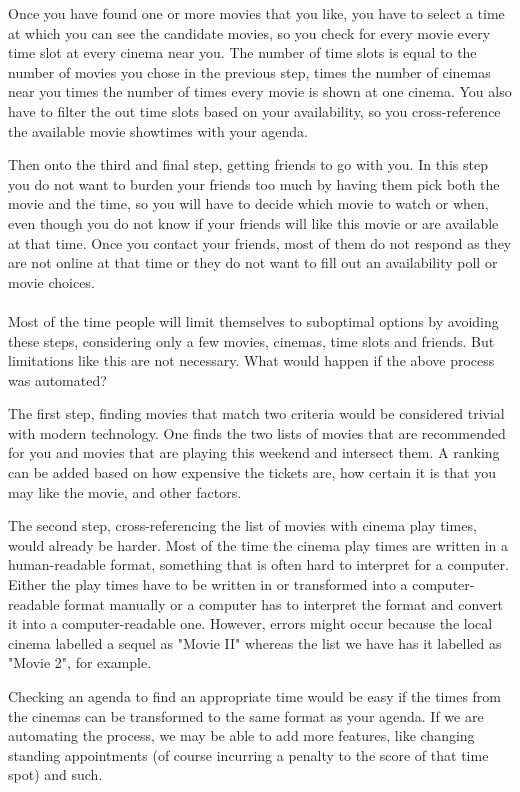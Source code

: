 \documentclass{article}
\begin{document}
 Once you have found one or more movies that you like, you have to select a time at which you can see the candidate movies, so you check for every movie every time slot at every cinema near you. The number of time slots is equal to the number of movies you chose in the previous step, times the number of cinemas near you times the number of times every movie is shown at one cinema. You also have to filter the out time slots based on your availability, so you cross-reference the available movie showtimes with your agenda.
 
 Then onto the third and final step, getting friends to go with you. In this step you do not want to burden your friends too much by having them pick both the movie and the time, so you will have to decide which movie to watch or when, even though you do not know if your friends will like this movie or are available at that time. Once you contact your friends, most of them do not respond as they are not online at that time or they do not want to fill out an availability poll or movie choices.
 \paragraph{}
 Most of the time people will limit themselves to suboptimal options by avoiding these steps, considering only a few movies, cinemas, time slots and friends. But limitations like this are not necessary. What would happen if the above process was automated?
 
The first step, finding movies that match two criteria would be considered trivial with modern technology. One finds the two lists of movies that are recommended for you and movies that are playing this weekend and intersect them. A ranking can be added based on how expensive the tickets are, how certain it is that you may like the movie, and other factors. 

 The second step, cross-referencing the list of movies with cinema play times, would already be harder. Most of the time the cinema play times are written in a human-readable format, something that is often hard to interpret for a computer. Either the play times have to be written in or transformed into a computer-readable format manually or a computer has to interpret the format and convert it into a computer-readable one. However, errors might occur because the local cinema labelled a sequel as "Movie II" whereas the list we have has it labelled as "Movie 2", for example.
 
 Checking an agenda to find an appropriate time would be easy if the times from the cinemas can be transformed to the same format as your agenda. If we are automating the process, we may be able to add more features, like changing standing appointments (of course incurring a penalty to the score of that time spot) and such.
 
\end{document}
